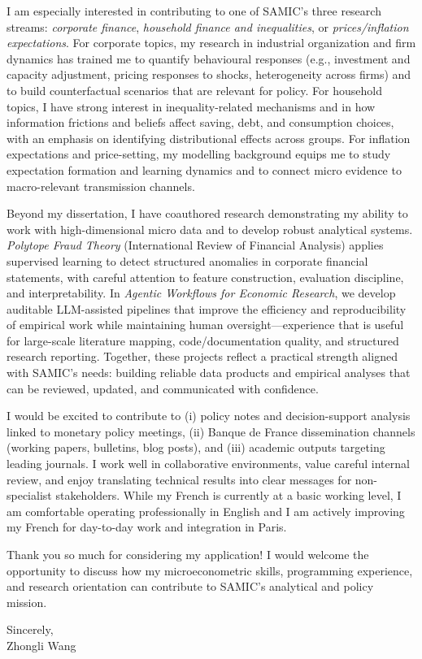 \documentclass[11pt]{article}
\begin{document}
I am especially interested in contributing to one of SAMIC's three research streams: \textit{corporate finance}, \textit{household finance and inequalities}, or \textit{prices/inflation expectations}. 
For corporate topics, my research in industrial organization and firm dynamics has trained me to quantify behavioural responses (e.g., investment and capacity adjustment, pricing responses to shocks, heterogeneity across firms) and to build counterfactual scenarios that are relevant for policy. 
For household topics, I have strong interest in inequality-related mechanisms and in how information frictions and beliefs affect saving, debt, and consumption choices, with an emphasis on identifying distributional effects across groups. 
For inflation expectations and price-setting, my modelling background equips me to study expectation formation and learning dynamics and to connect micro evidence to macro-relevant transmission channels.

Beyond my dissertation, I have coauthored research demonstrating my ability to work with high-dimensional micro data and to develop robust analytical systems. 
\textit{Polytope Fraud Theory} (International Review of Financial Analysis) applies supervised learning to detect structured anomalies in corporate financial statements, with careful attention to feature construction, evaluation discipline, and interpretability. 
In \textit{Agentic Workflows for Economic Research}, we develop auditable LLM-assisted pipelines that improve the efficiency and reproducibility of empirical work while maintaining human oversight---experience that is useful for large-scale literature mapping, code/documentation quality, and structured research reporting. 
Together, these projects reflect a practical strength aligned with SAMIC's needs: building reliable data products and empirical analyses that can be reviewed, updated, and communicated with confidence.

I would be excited to contribute to (i) policy notes and decision-support analysis linked to monetary policy meetings, (ii) Banque de France dissemination channels (working papers, bulletins, blog posts), and (iii) academic outputs targeting leading journals. 
I work well in collaborative environments, value careful internal review, and enjoy translating technical results into clear messages for non-specialist stakeholders. 
While my French is currently at a basic working level, I am comfortable operating professionally in English and I am actively improving my French for day-to-day work and integration in Paris.

Thank you so much for considering my application! 
I would welcome the opportunity to discuss how my microeconometric skills, programming experience, and research orientation can contribute to SAMIC's analytical and policy mission.

\vspace{6mm}

\noindent Sincerely,\\[12mm]
\noindent Zhongli Wang
\end{document}
